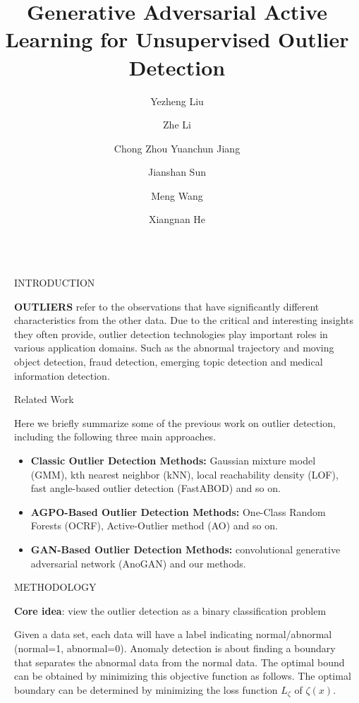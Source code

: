 \documentclass[final]{beamer}
\title{Generative Adversarial Active Learning for
	Unsupervised Outlier Detection}
\author{Yezheng Liu \inst{1} \and Zhe Li \inst{2} \and  Chong Zhou \inst{2} Yuanchun Jiang \inst{2} \and Jianshan Sun \inst{2}  \and Meng Wang \inst{2} \and Xiangnan He \inst{2} }
\institute[shortinst]{\inst{1} Some Institute \samelineand \inst{2} Another Institute}
\newlength{\sepwidth}
\newlength{\colwidth}
\newcommand{\separatorcolumn}{\begin{column}{\sepwidth}\end{column}}
\begin{document}
\begin{frame}[t]
\begin{columns}[t]
\separatorcolumn

\begin{column}{\colwidth}

  \begin{block}{INTRODUCTION}

    \textbf{OUTLIERS} refer to the observations that have significantly different characteristics from the other data. Due to the critical and interesting insights they often provide, outlier detection technologies play important roles in various application domains. Such as the abnormal trajectory and moving object detection, fraud detection, emerging topic detection and medical information detection.

  \end{block}


  \begin{block}{Related Work}

    Here we briefly summarize some of the previous work on outlier detection, including the following three main approaches.

    \begin{itemize}
    	
      \item \textbf{Classic Outlier Detection Methods:} \justifying Gaussian mixture model (GMM), kth nearest neighbor (kNN), local reachability density (LOF), fast angle-based outlier detection (FastABOD) and so on.
      \item \textbf{AGPO-Based Outlier Detection Methods:} \justifying One-Class Random Forests (OCRF), Active-Outlier method (AO) and so on.
      \item \textbf{GAN-Based Outlier Detection Methods:}
      \justifying convolutional generative adversarial network (AnoGAN) and our methods.
      
    \end{itemize}

  \end{block}

  \begin{alertblock}{METHODOLOGY}
	
	\textbf{Core idea}: view the outlier detection as a binary classification problem
	
	Given a data set, each data will have a label indicating normal/abnormal (normal=1, abnormal=0). Anomaly detection is about finding a boundary that separates the abnormal data from the normal data. The optimal bound can be obtained by minimizing this objective function as follows. The optimal boundary can be determined by minimizing the loss function $L_{\zeta}$ of $\zeta(x)$.
	

\end{alertblock}
\end{column}
\end{columns}
\end{frame}
\end{document}
